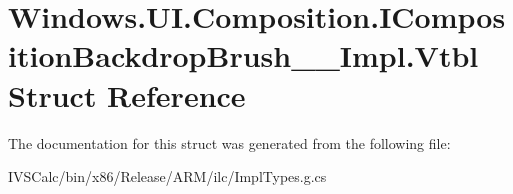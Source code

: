 \hypertarget{struct_windows_1_1_u_i_1_1_composition_1_1_i_composition_backdrop_brush_____impl_1_1_vtbl}{}\section{Windows.\+U\+I.\+Composition.\+I\+Composition\+Backdrop\+Brush\+\_\+\+\_\+\+Impl.\+Vtbl Struct Reference}
\label{struct_windows_1_1_u_i_1_1_composition_1_1_i_composition_backdrop_brush_____impl_1_1_vtbl}


The documentation for this struct was generated from the following file\+:\begin{DoxyCompactItemize}
\item 
I\+V\+S\+Calc/bin/x86/\+Release/\+A\+R\+M/ilc/Impl\+Types.\+g.\+cs\end{DoxyCompactItemize}
